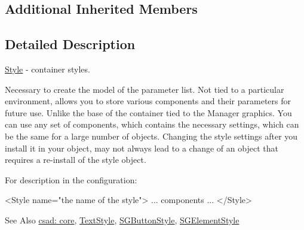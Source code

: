 \subsection*{Additional Inherited Members}


\subsection{Detailed Description}
\hyperlink{classcsad_1_1_style}{Style} -\/ container styles. 

Necessary to create the model of the parameter list. Not tied to a particular environment, allows you to store various components and their parameters for future use. Unlike the base of the container tied to the Manager graphics. You can use any set of components, which contains the necessary settings, which can be the same for a large number of objects. Changing the style settings after you install it in your object, may not always lead to a change of an object that requires a re-\/install of the style object.

For description in the configuration\-: \begin{DoxyVerb}  <Style name="the name of the style">
  ... components ...
  </Style>
\end{DoxyVerb}


\begin{DoxySeeAlso}{See Also}
\hyperlink{group__core}{csad\-: core}, \hyperlink{classcsad_1_1_text_style}{Text\-Style}, \hyperlink{classcsad_1_1_s_g_button_style}{S\-G\-Button\-Style}, \hyperlink{classcsad_1_1_s_g_element_style}{S\-G\-Element\-Style} 
\end{DoxySeeAlso}
